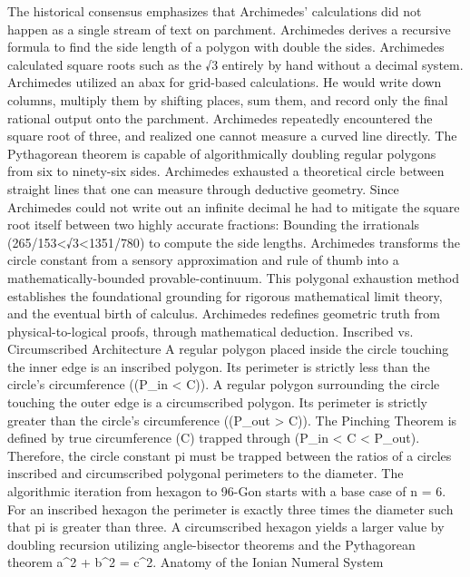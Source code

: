 The historical consensus emphasizes that Archimedes’ calculations did not happen as a single stream of text on parchment. Archimedes derives a recursive formula to find the side length of a polygon with double the sides. Archimedes calculated square roots such as the √3 entirely by hand without a decimal system. Archimedes utilized an abax for grid-based calculations. He would write down columns, multiply them by shifting places, sum them, and record only the final rational output onto the parchment. Archimedes repeatedly encountered the square root of three, and realized one cannot measure a curved line directly. The Pythagorean theorem is capable of algorithmically doubling regular polygons from six to ninety-six sides. Archimedes exhausted a theoretical circle between straight lines that one can measure through deductive geometry. Since Archimedes could not write out an infinite decimal he had to mitigate the square root itself between two highly accurate fractions:
Bounding the irrationals ({265}/{153}<{√3}<{1351}/{780}) to compute the side lengths.
Archimedes transforms the circle constant from a sensory approximation and rule of thumb into a mathematically-bounded provable-continuum. This polygonal exhaustion method establishes the foundational grounding for rigorous mathematical limit theory, and the eventual birth of calculus. Archimedes redefines geometric truth from physical-to-logical proofs, through mathematical deduction. 
Inscribed vs. Circumscribed Architecture
A regular polygon placed inside the circle touching the inner edge is an inscribed polygon. Its perimeter is strictly less than the circle's circumference ((P_{in} < C)). A regular polygon surrounding the circle touching the outer edge is a circumscribed polygon. Its perimeter is strictly greater than the circle's circumference ((P_{out} > C)). The Pinching Theorem is defined by true circumference (C) trapped through (P_{in} < C < P_{out}). Therefore, the circle constant pi must be trapped between the ratios of a circles inscribed and circumscribed polygonal perimeters to the diameter. The algorithmic iteration from hexagon to 96-Gon starts with a base case of n = 6. For an inscribed hexagon the perimeter is exactly three times the diameter such that pi is greater than three. A circumscribed hexagon yields a larger value by doubling recursion utilizing angle-bisector theorems and the Pythagorean theorem a^2 + b^2 = c^2. 
Anatomy of the Ionian Numeral System
